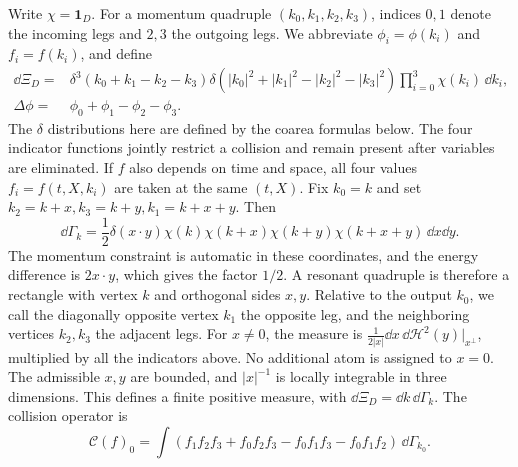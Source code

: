 Write $\chi=\mathbf1_D$. For a momentum quadruple $(k_0,k_1,k_2,k_3)$,
indices $0,1$ denote the incoming legs and $2,3$ the outgoing legs. We abbreviate
$\phi_i=\phi(k_i)$ and $f_i=f(k_i)$, and define
\begin{align}
 \dd\Xi_D={}&\delta^3(k_0+k_1-k_2-k_3)
 \delta(|k_0|^2+|k_1|^2-|k_2|^2-|k_3|^2)
 \prod_{i=0}^3\chi(k_i)\,\dd k_i,\label{geom:measure}\\
 \Delta\phi={}&\phi_0+\phi_1-\phi_2-\phi_3.
\end{align}
The $\delta$ distributions here are defined by the coarea formulas below.
The four indicator functions jointly restrict a collision and remain present
after variables are eliminated. If $f$ also depends on time and space, all four
values $f_i=f(t,X,k_i)$ are taken at the same $(t,X)$.
Fix $k_0=k$ and set $k_2=k+x,k_3=k+y,k_1=k+x+y$. Then
\begin{equation}\label{geom:gamma}
\dd\Gamma_k=\frac12\delta(x\cdot y)
\chi(k)\chi(k+x)\chi(k+y)\chi(k+x+y)\,\dd x\dd y.
\end{equation}
The momentum constraint is automatic in these coordinates, and the energy
difference is $2x\cdot y$, which gives the factor $1/2$. A resonant quadruple
is therefore a rectangle with vertex $k$ and orthogonal sides $x,y$.
Relative to the output $k_0$, we call the diagonally opposite vertex $k_1$
the opposite leg, and the neighboring vertices $k_2,k_3$ the adjacent legs.
For $x\ne0$, the measure is
$\frac1{2|x|}\dd x\,\dd\mathcal H^2(y)|_{x^\perp}$, multiplied by all
the indicators above. No additional atom is assigned to $x=0$.
The admissible $x,y$ are bounded, and $|x|^{-1}$ is locally integrable
in three dimensions. This defines a finite positive measure, with
$\dd\Xi_D=\dd k\,\dd\Gamma_k$.
The collision operator is
\begin{equation}\label{geom:collision}
 \mathcal C(f)_0=\int
 (f_1f_2f_3+f_0f_2f_3-f_0f_1f_3-f_0f_1f_2)\,\dd\Gamma_{k_0}.
\end{equation}

